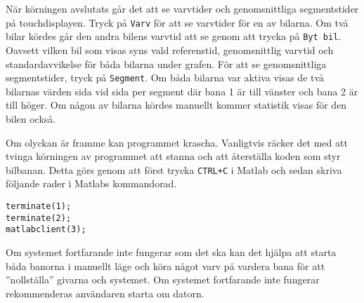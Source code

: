 
När körningen avslutats går det att se varvtider och genomsnittliga
segmentstider på touchdisplayen. Tryck på \texttt{Varv} för att se varvtider för
en av bilarna. Om två bilar kördes går den andra bilens varvtid att se genom att
trycka på \texttt{Byt bil}. Oavsett vilken bil som visas syns vald referenstid,
genomsnittlig varvtid och standardavvikelse för båda bilarna under grafen. För
att se genomsnittliga segmentstider, tryck på \texttt{Segment}. Om båda bilarna
var aktiva visas de två bilarnas värden sida vid sida per segment där bana 1 är
till vänster och bana 2 är till höger. Om någon av bilarna kördes manuellt
kommer statistik visas för den bilen också.

% 

Om olyckan är framme kan programmet krascha. Vanligtvis räcker det med att
tvinga körningen av programmet att stanna och att återställa koden som styr
bilbanan. Detta görs genom att först trycka \texttt{CTRL+C} i Matlab och sedan
skriva följande rader i Matlabs kommandorad.

\begin{verbatim}
terminate(1);
terminate(2);
matlabclient(3);
\end{verbatim}

Om systemet fortfarande inte fungerar som det ska kan det hjälpa att starta båda
banorna i manuellt läge och köra något varv på vardera bana för att
''nollställa'' givarna och systemet. Om systemet fortfarande inte fungerar
rekommenderas användaren starta om datorn.

